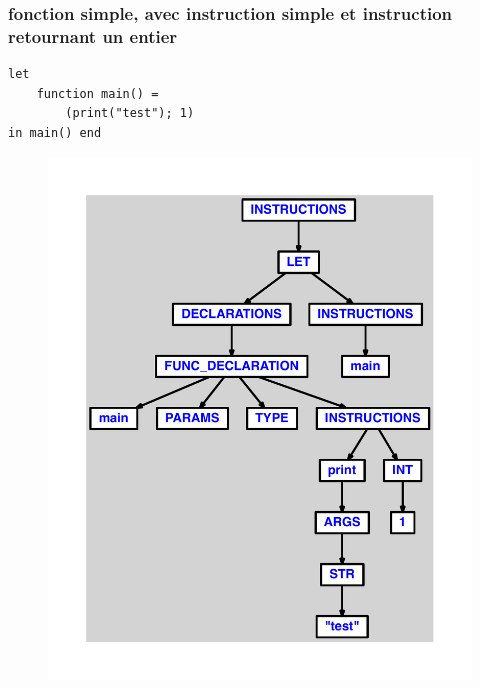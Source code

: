 \documentclass{article}
\begin{document}
\subsubsection{fonction simple, avec instruction simple et instruction retournant un entier}
\begin{lstlisting}
let
	function main() =
		(print("test"); 1)
in main() end
\end{lstlisting}
\newpage
\begin{figure}[H]
\centering
\includegraphics[max width=\textwidth]{ast/ast_232.pdf}
\end{figure}
\newpage
\end{document}
